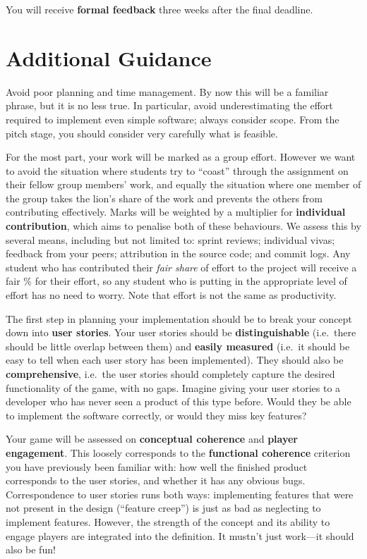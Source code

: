 \documentclass{../../fal_assignment}
\begin{document}
You will receive \textbf{formal feedback} three weeks after the final deadline.

\section*{Additional Guidance}

Avoid poor planning and time management. By now this will be a familiar phrase, but it is no less true.
In particular, avoid underestimating the effort required to implement even simple software; always consider scope.
From the pitch stage, you should consider very carefully what is feasible.

For the most part, your work will be marked as a group effort.
However we want to avoid the situation where students try to ``coast'' through the assignment
on their fellow group members' work,
and equally the situation where one member of the group takes the lion's share of the work
and prevents the others from contributing effectively.
Marks will be weighted by a multiplier for \textbf{individual contribution},
which aims to penalise both of these behaviours.
We assess this by several means, including but not limited to: sprint reviews; individual vivas; feedback from your peers;
attribution in the source code; and commit logs.
Any student who has contributed their \textit{fair share} of effort to the project will receive a fair \% for their effort,
so any student who is putting in the appropriate level of effort has no need to worry.
Note that effort is not the same as productivity.

The first step in planning your implementation should be to break your concept down into \textbf{user stories}. 
Your user stories should be \textbf{distinguishable} (i.e.\ there should be little overlap between them)
and \textbf{easily measured} (i.e.\ it should be easy to tell when each user story has been implemented).
They should also be \textbf{comprehensive}, i.e.\ the user stories should completely capture the
desired functionality of the game, with no gaps.
Imagine giving your user stories to a developer who has never seen a product of this type before.
Would they be able to implement the software correctly, or would they miss key features?

Your game will be assessed on \textbf{conceptual coherence} and \textbf{player engagement}. This loosely corresponds to the \textbf{functional coherence} criterion you have previously been familiar with:
how well the finished product corresponds to the user stories,
and whether it has any obvious bugs.
Correspondence to user stories runs both ways:
implementing features that were not present in the design (``feature creep'')
is just as bad as neglecting to implement features.
However, the strength of the concept and its ability to engage players are integrated into the definition. It mustn't just work---it should also be fun!
\end{document}
